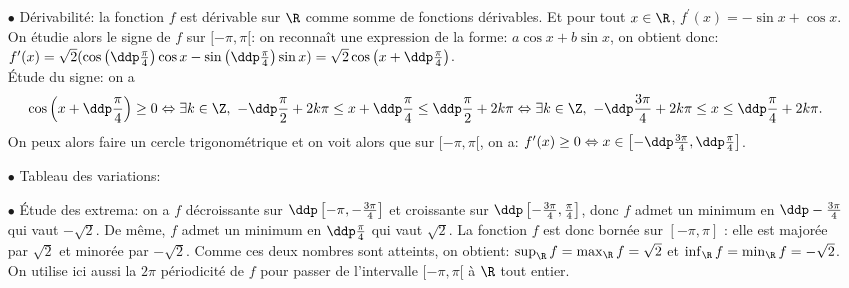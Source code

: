 \begin{correction}
\begin{enumerate}
\begin{itemize}
\begin{itemize}
\end{itemize}
Ainsi la fonction $f$ est $2\pi$ p\'eriodique. Ainsi on peut restreindre l'\'etude de la fonction $f$ \`{a} tout intervalle d'amplitude $2\pi$, par exemple: $\lbrack -\pi,\pi\rbrack$.
\item[$\bullet$] D\'erivabilit\'e: la fonction $f$ est d\'erivable sur $\R$ comme somme de fonctions d\'erivables. Et pour tout $x\in\R$, $f^{\prime}(x)=-\sin{x}+\cos{x}$.\\
\noindent On \'etudie alors le signe de $f$ sur $\lbrack -\pi,\pi\lbrack$: on reconna\^{i}t une expression de la forme: $a\cos{x}+b\sin{x}$, on obtient donc: $f^{\prime}(x)=\sqrt{2}( \cos{\left(\ddp\frac{\pi}{4} \right)}\cos{x}-\sin{\left(\ddp\frac{\pi}{4} \right)}\sin{x}   )=\sqrt{2}\cos{\left( x+\ddp\frac{\pi}{4} \right)}$. \\
\noindent \'Etude du signe: on a
$$\cos{\left( x+\ddp\frac{\pi}{4} \right)} \geq 0\Leftrightarrow \exists k\in\Z,\ -\ddp\frac{\pi}{2}+2k\pi\leq x+\ddp\frac{\pi}{4}\leq \ddp\frac{\pi}{2}+2k\pi\Leftrightarrow \exists k\in\Z,\ -\ddp\frac{3\pi}{4}+2k\pi\leq x\leq \ddp\frac{\pi}{4}+2k\pi.$$
On peux alors faire un cercle trigonom\'etrique et on voit alors que sur $\lbrack -\pi,\pi\lbrack$, on a: $f^{\prime}(x)\geq 0\Leftrightarrow x\in\left\lbrack  -\ddp\frac{3\pi}{4},\ddp\frac{\pi}{4}  \right\rbrack$.  
\item[$\bullet$] Tableau des variations:
\begin{center}
\end{center}
\item[$\bullet$] \'Etude des extrema: on a $f$ d\'ecroissante sur $\ddp \left[-\pi, -\frac{3\pi}{4}\right]$ et croissante sur $\ddp \left[-\frac{3\pi}{4}, \frac{\pi}{4}\right]$, donc $f$ admet un minimum en $\ddp-\frac{3\pi}{4}$ qui vaut $-\sqrt{2}$. De m\^eme, $f$ admet un minimum en $\ddp\frac{\pi}{4}$ qui vaut $\sqrt{2}$. La fonction $f$ est donc born\'ee sur $[-\pi, \pi]$ : elle est major\'ee par $\sqrt{2}$ et minor\'ee par 
$-\sqrt{2}$. Comme ces deux nombres sont atteints, on obtient: $\sup_{\R } f=\max_{\R} f=\sqrt{2}$ et $\inf_{\R } f=\min_{\R} f=-\sqrt{2}$. On utilise ici aussi la $2\pi$ p\'eriodicit\'e de $f$ pour passer de l'intervalle $\lbrack -\pi,\pi\lbrack$ \`{a} $\R$ tout entier.

\end{itemize}
\end{enumerate}
\end{correction}
